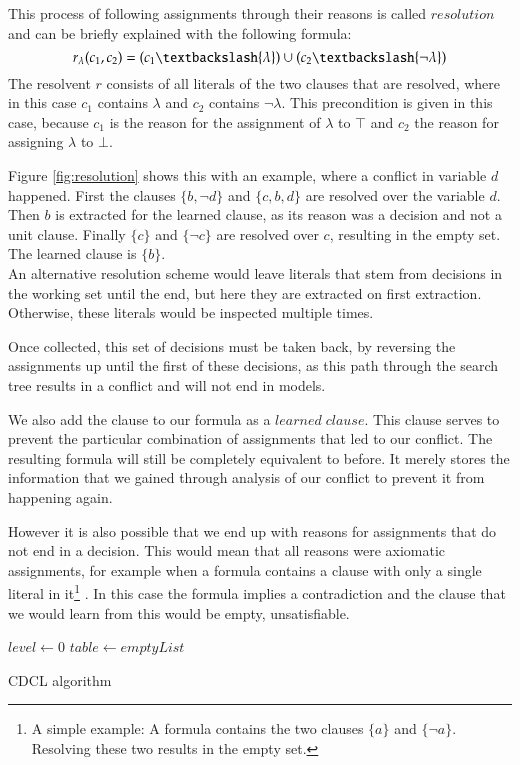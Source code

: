 This process of following assignments through their reasons is called $resolution$ and can be briefly explained with the following formula:
$$
r_\lambda(c_1,c_2) = (c_1 \textbackslash \{\lambda\}) \cup (c_2 \textbackslash \{\neg \lambda\})
$$
The resolvent $r$ consists of all literals of the two clauses that are resolved, where in this case $c_1$ contains $\lambda$ and $c_2$ contains $\neg \lambda$. This precondition is given in this case, because $c_1$ is the reason for the assignment of $\lambda$ to $\top$ and $c_2$ the reason for assigning $\lambda$ to $\bot$. 

Figure \ref{fig:resolution} shows this with an example, where a conflict in variable $d$ happened. First the clauses $\{b,\neg d\}$ and $\{c,b,d\}$ are resolved over the variable $d$. Then $b$ is extracted for the learned clause, as its reason was a decision and not a unit clause. Finally $\{c\}$ and $\{\neg c\}$ are resolved over $c$, resulting in the empty set. The learned clause is $\{b\}$.\\
An alternative resolution scheme would leave literals that stem from decisions in the working set until the end, but here they are extracted on first extraction. Otherwise, these literals would be inspected multiple times.

Once collected, this set of decisions must be taken back, by reversing the assignments up until the first of these decisions, as this path through the search tree results in a conflict and will not end in models. 

We also add the clause to our formula as a $learned\; clause$. This clause serves to prevent the particular combination of assignments that led to our conflict. The resulting formula will still be completely equivalent to before. It merely stores the information that we gained through analysis of our conflict to prevent it from happening again.

However it is also possible that we end up with reasons for assignments that do not end in a decision. This would mean that all reasons were axiomatic assignments, for example when a formula contains a clause with only a single literal in it\footnote{A simple example: A formula contains the two clauses $\{a\}$ and $\{\neg a\}$. Resolving these two results in the empty set.}  .
In this case the formula implies a contradiction and the clause that we would learn from this would be empty, unsatisfiable.


\begin{algorithm}
\DontPrintSemicolon
{}
$level \gets 0$\;
$table \gets emptyList$\;
\caption{{\sc CDCL algorithm}}
\end{algorithm}

